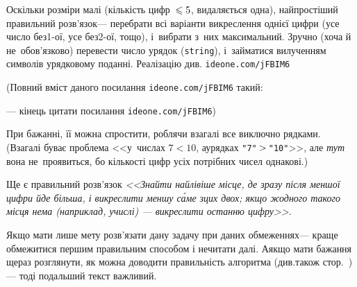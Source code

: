 \documentclass[14pt,a4paper]{extarticle}
\def\dib#1{\,#1\discretionary{}{\mbox{$#1$}}{}\,}
\renewcommand{\baselinestretch}{1.3125}
\begin{document}
Оскільки розміри малі (кількість цифр~$\leqslant5$, видаляється одна), найпростіший правильний розв’язок\nolinebreak[3] --- перебрати всі варіанти викреслення однієї цифри (усе число без\nolinebreak[3] \mbox{1-ої}, усе без\nolinebreak[3] \mbox{2-ої}, тощо), і~вибрати з~них максимальний. Зручно (хоча й не~обов'язково) перевести число у\nolinebreak[3] рядок (\verb"string"), і~займатися вилученням символів у\nolinebreak[3] рядковому поданні. Реалізацію див. 
\verb"ideone.com/jFBIM6"


{\color{green}\begin{small}

\renewcommand{\baselinestretch}{0.875}

(Повний вміст даного посилання \verb"ideone.com/jFBIM6" такий:

--- кінець цитати посилання \verb"ideone.com/jFBIM6")

\end{small}}


\hspace{0.5em plus 1em}
При бажанні, її можна спростити, роблячи взагалі все виключно рядками. (Взагалі буває проблема <<у~числах ${7{<}10}$, а\nolinebreak[3] у\nolinebreak[3] рядках \verb|"7"|$\dib{{>}}$\verb|"10"|>>, але \emph{тут} вона не~проявиться, бо кількості цифр усіх потрібних чисел однакові.)

Ще є правильний розв’язок \textsl{<<Знайти найлівіше місце, де зразу після меншої цифри йде більша, і викреслити меншу с\'{а}ме з\nolinebreak[2] цих двох; якщо жодного такого місця нема (наприклад, у\nolinebreak[3] числі) --- викреслити останню цифру>>}.

Якщо мати лише мету розв'язати дану задачу при даних обмеженнях\nolinebreak[3] --- краще обмежитися першим правильним способом і не\nolinebreak[3] читати далі. А\nolinebreak[3] якщо мати бажання ще\nolinebreak[2] раз розглянути, як можна доводити правильність алгоритма (див.\nolinebreak[3] також стор.~\pageref{text:need-or-no-need-to-prove})\nolinebreak[3] --- тоді подальший текст важливий. 
\end{document}
